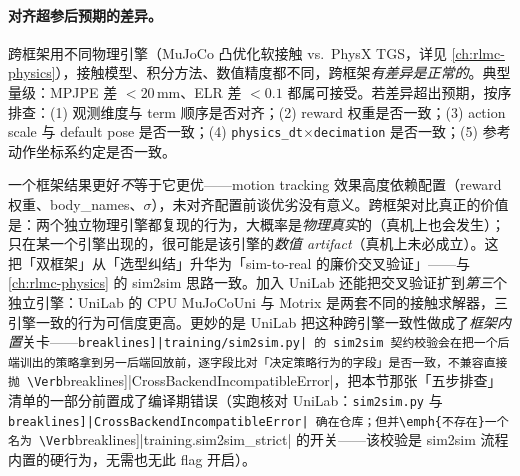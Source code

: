\paragraph{对齐超参后预期的差异。}跨框架用不同物理引擎（MuJoCo 凸优化软接触 vs.\ PhysX TGS，详见 \cref{ch:rlmc-physics}），接触模型、积分方法、数值精度都不同，跨框架\emph{有差异是正常的}。典型量级：MPJPE 差 $<20$\,mm、ELR 差 $<0.1$ 都属可接受。若差异超出预期，按序排查：(1) 观测维度与 term 顺序是否对齐；(2) reward 权重是否一致；(3) action scale 与 default pose 是否一致；(4) \verb|physics_dt|$\times$\verb|decimation| 是否一致；(5) 参考动作坐标系约定是否一致。


\begin{insight}\label{ins:rlmc-mi-cross}
一个框架结果更好\emph{不}等于它更优——motion tracking 效果高度依赖配置（reward 权重、body\_names、$\sigma$），未对齐配置前谈优劣没有意义。跨框架对比真正的价值是：两个独立物理引擎都复现的行为，大概率是\emph{物理真实}的（真机上也会发生）；只在某一个引擎出现的，很可能是该引擎的\emph{数值 artifact}（真机上未必成立）。这把「双框架」从「选型纠结」升华为「sim-to-real 的廉价交叉验证」——与 \cref{ch:rlmc-physics} 的 sim2sim 思路一致。加入 UniLab 还能把交叉验证扩到\emph{第三}个独立引擎：UniLab 的 CPU MuJoCoUni 与 Motrix 是两套不同的接触求解器，三引擎一致的行为可信度更高。更妙的是 UniLab 把这种跨引擎一致性做成了\emph{框架内置}关卡——\Verb[breaklines]|training/sim2sim.py| 的 sim2sim 契约校验会在把一个后端训出的策略拿到另一后端回放前，逐字段比对「决定策略行为的字段」是否一致，不兼容直接抛 \Verb[breaklines]|CrossBackendIncompatibleError|，把本节那张「五步排查」清单的一部分前置成了编译期错误（实跑核对 UniLab：\verb|sim2sim.py| 与 \Verb[breaklines]|CrossBackendIncompatibleError| 确在仓库；但并\emph{不存在}一个名为 \Verb[breaklines]|training.sim2sim_strict| 的开关——该校验是 sim2sim 流程内置的硬行为，无需也无此 flag 开启）。
\end{insight}

